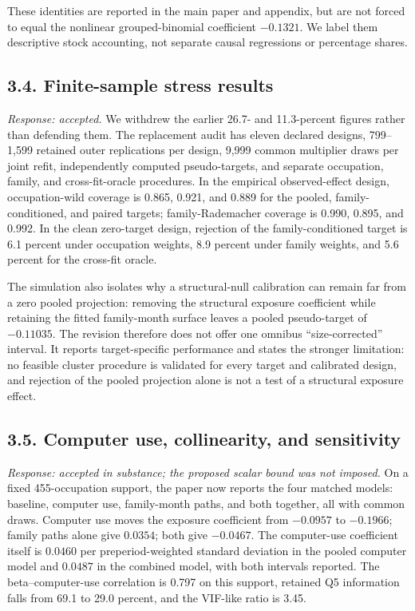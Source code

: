 \documentclass[11pt,letterpaper]{article}
\begin{document}
These identities are reported in the main paper and appendix, but are not forced to equal the nonlinear grouped-binomial coefficient $-0.1321$.  We label them descriptive stock accounting, not separate causal regressions or percentage shares.

\subsection*{3.4. Finite-sample stress results}

\emph{Response: accepted.}  We withdrew the earlier 26.7- and 11.3-percent figures rather than defending them.  The replacement audit has eleven declared designs, 799--1,599 retained outer replications per design, 9,999 common multiplier draws per joint refit, independently computed pseudo-targets, and separate occupation, family, and cross-fit-oracle procedures.  In the empirical observed-effect design, occupation-wild coverage is 0.865, 0.921, and 0.889 for the pooled, family-conditioned, and paired targets; family-Rademacher coverage is 0.990, 0.895, and 0.992.  In the clean zero-target design, rejection of the family-conditioned target is 6.1 percent under occupation weights, 8.9 percent under family weights, and 5.6 percent for the cross-fit oracle.

The simulation also isolates why a structural-null calibration can remain far from a zero pooled projection: removing the structural exposure coefficient while retaining the fitted family-month surface leaves a pooled pseudo-target of $-0.11035$.  The revision therefore does not offer one omnibus ``size-corrected'' interval.  It reports target-specific performance and states the stronger limitation: no feasible cluster procedure is validated for every target and calibrated design, and rejection of the pooled projection alone is not a test of a structural exposure effect.

\subsection*{3.5. Computer use, collinearity, and sensitivity}

\emph{Response: accepted in substance; the proposed scalar bound was not imposed.}  On a fixed 455-occupation support, the paper now reports the four matched models: baseline, computer use, family-month paths, and both together, all with common draws.  Computer use moves the exposure coefficient from $-0.0957$ to $-0.1966$; family paths alone give $0.0354$; both give $-0.0467$.  The computer-use coefficient itself is $0.0460$ per preperiod-weighted standard deviation in the pooled computer model and $0.0487$ in the combined model, with both intervals reported.  The beta--computer-use correlation is 0.797 on this support, retained Q5 information falls from 69.1 to 29.0 percent, and the VIF-like ratio is 3.45.
\end{document}
